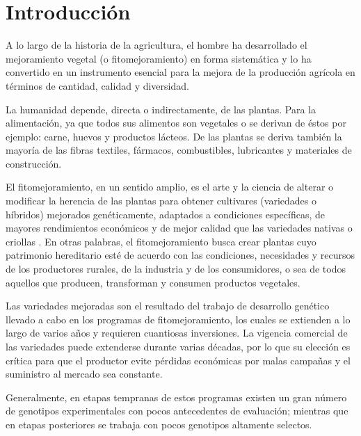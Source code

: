 

\chapter{Introducción}

A lo largo de la historia de la agricultura, el hombre ha desarrollado el mejoramiento vegetal (o fitomejoramiento) en forma sistemática y lo ha convertido en un instrumento esencial para la mejora de la producción agrícola en términos de cantidad, calidad y diversidad.  

La humanidad depende, directa o indirectamente, de las plantas. Para la alimentación, ya que todos sus alimentos son vegetales o se derivan de éstos por ejemplo: carne, huevos y productos lácteos. De las plantas se deriva también la mayoría de las fibras textiles, fármacos, combustibles, lubricantes y materiales de construcción.

El fitomejoramiento, en un sentido amplio, es el arte y la ciencia de alterar o modificar la herencia de las plantas para obtener cultivares (variedades o híbridos) mejorados genéticamente, adaptados a condiciones específicas, de mayores rendimientos económicos y de mejor calidad que las variedades nativas o criollas \citep{Allard67}. En otras palabras, el fitomejoramiento busca crear plantas cuyo patrimonio hereditario esté de acuerdo con las condiciones, necesidades y recursos de los productores rurales, de la industria y de los consumidores, o sea de todos aquellos que producen, transforman y consumen productos vegetales. 

Las variedades mejoradas son el resultado del trabajo de desarrollo genético llevado a cabo en los programas de fitomejoramiento, los cuales se extienden a lo largo de varios años y requieren cuantiosas inversiones. La vigencia comercial de las variedades puede extenderse durante varias décadas, por lo que su elección es crítica para que el productor evite pérdidas económicas por malas campañas y el suministro al mercado sea constante. 

Generalmente, en etapas tempranas de estos programas existen un gran número de genotipos experimentales con pocos antecedentes de evaluación; mientras que en etapas posteriores  se trabaja con pocos genotipos altamente selectos. 

